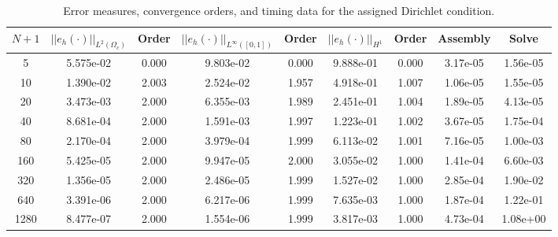 \documentclass[a4paper, 12pt]{article}
\begin{document}
\begin{table}[H]
\caption{ Error measures, convergence orders, and timing data for the assigned Dirichlet condition.}
\vspace{0.1in}
\centering
\begin{tabular}{|c|c|c|c|c|c|c|c|c|}
\hline
 $N+1$&  $||e_h(\cdot)||_{L^2(\Omega_c)}$ & Order & $||e_h(\cdot)||_{L^\infty([0,1])}$ & Order & $||e_h(\cdot)||_{H^1}$ & Order & Assembly & Solve \\
 \hline   %
5    & 5.575e-02 & 0.000 & 9.803e-02 & 0.000 & 9.888e-01 & 0.000 & 3.17e-05 & 1.56e-05\\
10   & 1.390e-02 & 2.003 & 2.524e-02 & 1.957 & 4.918e-01 & 1.007 & 1.06e-05 & 1.55e-05\\
20   & 3.473e-03 & 2.000 & 6.355e-03 & 1.989 & 2.451e-01 & 1.004 & 1.89e-05 & 4.13e-05\\
40   & 8.681e-04 & 2.000 & 1.591e-03 & 1.997 & 1.223e-01 & 1.002 & 3.67e-05 & 1.75e-04\\
80   & 2.170e-04 & 2.000 & 3.979e-04 & 1.999 & 6.113e-02 & 1.001 & 7.16e-05 & 1.00e-03\\
160  & 5.425e-05 & 2.000 & 9.947e-05 & 2.000 & 3.055e-02 & 1.000 & 1.41e-04 & 6.60e-03\\
320  & 1.356e-05 & 2.000 & 2.486e-05 & 1.999 & 1.527e-02 & 1.000 & 2.85e-04 & 1.90e-02\\
640  & 3.391e-06 & 2.000 & 6.217e-06 & 1.999 & 7.635e-03 & 1.000 & 1.87e-04 & 1.22e-01\\
1280 & 8.477e-07 & 2.000 & 1.554e-06 & 1.999 & 3.817e-03 & 1.000 & 4.73e-04 & 1.08e+00\\
\hline
\end{tabular}
\label{tab:zdbc}
\end{table}
\end{document}
